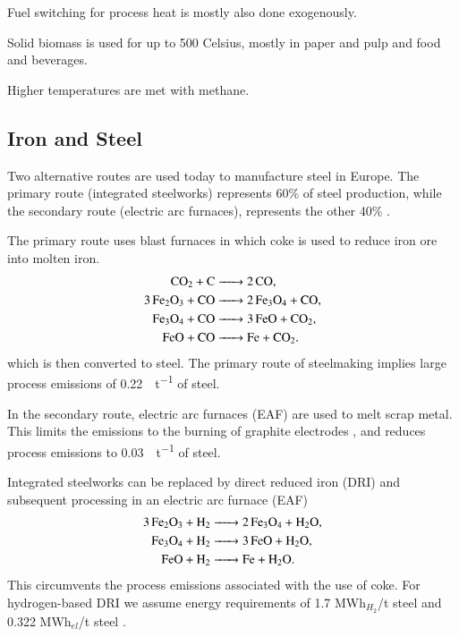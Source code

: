 Fuel switching for process heat is mostly also done exogenously.

Solid biomass is used for up to 500 Celsius, mostly in paper and pulp and food
and beverages.

Higher temperatures are met with methane.


\subsection{Iron and Steel}
\label{sec:si:industry:steel}


Two alternative routes are used today to manufacture steel in Europe. The
primary route (integrated steelworks) represents 60\% of steel production, while
the secondary route (electric arc furnaces), represents the other 40\%
.

The primary route uses blast furnaces in which coke is used to reduce iron ore
into molten iron.
\begin{align}
    \ce{CO2 + C &-> 2CO}, \\
    \ce{3Fe2O3 + CO &-> 2Fe3O4 + CO}, \\
    \ce{Fe3O4 + CO &-> 3FeO + CO2}, \\
    \ce{FeO + CO &-> Fe + CO2}.
\end{align}
which is then converted to steel. The primary route of steelmaking implies large
process emissions of \SI{0.22}{\tco\per\tonne} of steel.

In the secondary route, electric arc furnaces (EAF) are used to melt scrap
metal. This limits the \co emissions to the burning of graphite electrodes
, and reduces process emissions to
\SI{0.03}{\tco\per\tonne} of steel.

Integrated steelworks can be replaced by direct reduced iron (DRI) and subsequent processing in an electric arc furnace (EAF)
\begin{align}
    \ce{3Fe2O3 + H2 &-> 2Fe3O4 + H2O}, \\
    \ce{Fe3O4 + H2 &-> 3FeO + H2O}, \\
    \ce{FeO + H2 &-> Fe + H2O}.
\end{align}
This circumvents the process emissions associated with the use of coke. For
hydrogen-based DRI we assume energy requirements of 1.7 MWh$_{H_2}$/t steel
 and 0.322 MWh$_{el}$/t steel
\citeS{}.

